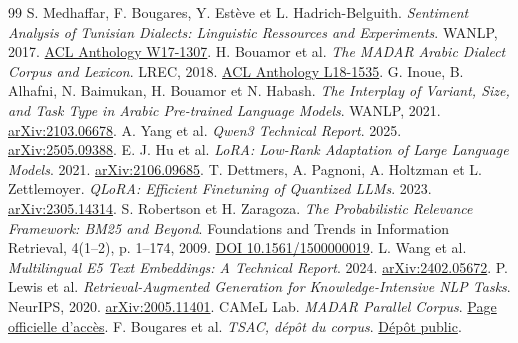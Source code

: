 {}
\begin{thebibliography}{99}
 S. Medhaffar, F. Bougares, Y. Estève et L. Hadrich-Belguith. \emph{Sentiment Analysis of Tunisian Dialects: Linguistic Ressources and Experiments}. WANLP, 2017. \href{https://aclanthology.org/W17-1307/}{ACL Anthology W17-1307}.
 H. Bouamor et al. \emph{The MADAR Arabic Dialect Corpus and Lexicon}. LREC, 2018. \href{https://aclanthology.org/L18-1535/}{ACL Anthology L18-1535}.
 G. Inoue, B. Alhafni, N. Baimukan, H. Bouamor et N. Habash. \emph{The Interplay of Variant, Size, and Task Type in Arabic Pre-trained Language Models}. WANLP, 2021. \href{https://arxiv.org/abs/2103.06678}{arXiv:2103.06678}.
 A. Yang et al. \emph{Qwen3 Technical Report}. 2025. \href{https://arxiv.org/abs/2505.09388}{arXiv:2505.09388}.
 E. J. Hu et al. \emph{LoRA: Low-Rank Adaptation of Large Language Models}. 2021. \href{https://arxiv.org/abs/2106.09685}{arXiv:2106.09685}.
 T. Dettmers, A. Pagnoni, A. Holtzman et L. Zettlemoyer. \emph{QLoRA: Efficient Finetuning of Quantized LLMs}. 2023. \href{https://arxiv.org/abs/2305.14314}{arXiv:2305.14314}.
 S. Robertson et H. Zaragoza. \emph{The Probabilistic Relevance Framework: BM25 and Beyond}. Foundations and Trends in Information Retrieval, 4(1–2), p. 1–174, 2009. \href{https://doi.org/10.1561/1500000019}{DOI 10.1561/1500000019}.
 L. Wang et al. \emph{Multilingual E5 Text Embeddings: A Technical Report}. 2024. \href{https://arxiv.org/abs/2402.05672}{arXiv:2402.05672}.
 P. Lewis et al. \emph{Retrieval-Augmented Generation for Knowledge-Intensive NLP Tasks}. NeurIPS, 2020. \href{https://arxiv.org/abs/2005.11401}{arXiv:2005.11401}.
 CAMeL Lab. \emph{MADAR Parallel Corpus}. \href{https://camel.abudhabi.nyu.edu/madar-parallel-corpus/}{Page officielle d’accès}.
 F. Bougares et al. \emph{TSAC, dépôt du corpus}. \href{https://github.com/fbougares/TSAC}{Dépôt public}.
\end{thebibliography}
